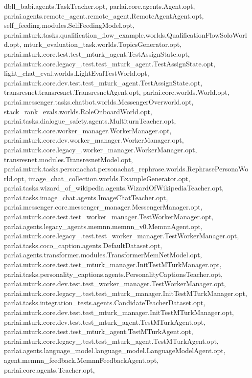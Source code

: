 dbll\+\_\+babi.\+agents.\+Task\+Teacher.\+opt, parlai.\+core.\+agents.\+Agent.\+opt, parlai.\+agents.\+remote\+\_\+agent.\+remote\+\_\+agent.\+Remote\+Agent\+Agent.\+opt, self\+\_\+feeding.\+modules.\+Self\+Feeding\+Model.\+opt, parlai.\+mturk.\+tasks.\+qualification\+\_\+flow\+\_\+example.\+worlds.\+Qualification\+Flow\+Solo\+World.\+opt, mturk\+\_\+evaluation\+\_\+task.\+worlds.\+Topics\+Generator.\+opt, parlai.\+mturk.\+core.\+test.\+test\+\_\+mturk\+\_\+agent.\+Test\+Assign\+State.\+opt, parlai.\+mturk.\+core.\+legacy\+\_.\+test.\+test\+\_\+mturk\+\_\+agent.\+Test\+Assign\+State.\+opt, light\+\_\+chat\+\_\+eval.\+worlds.\+Light\+Eval\+Test\+World.\+opt, parlai.\+mturk.\+core.\+dev.\+test.\+test\+\_\+mturk\+\_\+agent.\+Test\+Assign\+State.\+opt, transresnet.\+transresnet.\+Transresnet\+Agent.\+opt, parlai.\+core.\+worlds.\+World.\+opt, parlai.\+messenger.\+tasks.\+chatbot.\+worlds.\+Messenger\+Overworld.\+opt, stack\+\_\+rank\+\_\+evals.\+worlds.\+Role\+Onboard\+World.\+opt, parlai.\+tasks.\+dialogue\+\_\+safety.\+agents.\+Multiturn\+Teacher.\+opt, parlai.\+mturk.\+core.\+worker\+\_\+manager.\+Worker\+Manager.\+opt, parlai.\+mturk.\+core.\+dev.\+worker\+\_\+manager.\+Worker\+Manager.\+opt, parlai.\+mturk.\+core.\+legacy\+\_.\+worker\+\_\+manager.\+Worker\+Manager.\+opt, transresnet.\+modules.\+Transresnet\+Model.\+opt, parlai.\+mturk.\+tasks.\+personachat.\+personachat\+\_\+rephrase.\+worlds.\+Rephrase\+Persona\+World.\+opt, image\+\_\+chat\+\_\+collection.\+worlds.\+Example\+Generator.\+opt, parlai.\+tasks.\+wizard\+\_\+of\+\_\+wikipedia.\+agents.\+Wizard\+Of\+Wikipedia\+Teacher.\+opt, parlai.\+tasks.\+image\+\_\+chat.\+agents.\+Image\+Chat\+Teacher.\+opt, parlai.\+messenger.\+core.\+messenger\+\_\+manager.\+Messenger\+Manager.\+opt, parlai.\+mturk.\+core.\+test.\+test\+\_\+worker\+\_\+manager.\+Test\+Worker\+Manager.\+opt, parlai.\+agents.\+legacy\+\_\+agents.\+memnn.\+memnn\+\_\+v0.\+Memnn\+Agent.\+opt, parlai.\+mturk.\+core.\+legacy\+\_.\+test.\+test\+\_\+worker\+\_\+manager.\+Test\+Worker\+Manager.\+opt, parlai.\+tasks.\+coco\+\_\+caption.\+agents.\+Default\+Dataset.\+opt, parlai.\+agents.\+transformer.\+modules.\+Transformer\+Mem\+Net\+Model.\+opt, parlai.\+mturk.\+core.\+test.\+test\+\_\+mturk\+\_\+manager.\+Init\+Test\+M\+Turk\+Manager.\+opt, parlai.\+tasks.\+personality\+\_\+captions.\+agents.\+Personality\+Captions\+Teacher.\+opt, parlai.\+mturk.\+core.\+dev.\+test.\+test\+\_\+worker\+\_\+manager.\+Test\+Worker\+Manager.\+opt, parlai.\+mturk.\+core.\+legacy\+\_.\+test.\+test\+\_\+mturk\+\_\+manager.\+Init\+Test\+M\+Turk\+Manager.\+opt, parlai.\+tasks.\+integration\+\_\+tests.\+agents.\+Candidate\+Teacher\+Dataset.\+opt, parlai.\+mturk.\+core.\+dev.\+test.\+test\+\_\+mturk\+\_\+manager.\+Init\+Test\+M\+Turk\+Manager.\+opt, parlai.\+mturk.\+core.\+dev.\+test.\+test\+\_\+mturk\+\_\+agent.\+Test\+M\+Turk\+Agent.\+opt, parlai.\+mturk.\+core.\+test.\+test\+\_\+mturk\+\_\+agent.\+Test\+M\+Turk\+Agent.\+opt, parlai.\+mturk.\+core.\+legacy\+\_.\+test.\+test\+\_\+mturk\+\_\+agent.\+Test\+M\+Turk\+Agent.\+opt, parlai.\+agents.\+language\+\_\+model.\+language\+\_\+model.\+Language\+Model\+Agent.\+opt, agent.\+memnn\+\_\+feedback.\+Memnn\+Feedback\+Agent.\+opt, parlai.\+core.\+agents.\+Teacher.\+opt, 
